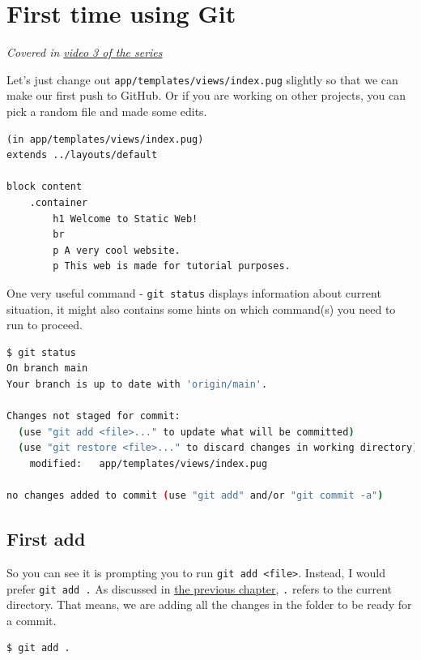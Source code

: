 \section{First time using Git}
\label{sec:gitfirst}

\textit{Covered in \href{https://www.youtube.com/watch?v=wQmFz-Ggxuo&list=PLjGmdnqrOKuYXiu7lgG5HW71jPEUd1XCm&index=4}{video 3 of the series}}
\vspace{6mm}

Let's just change out \texttt{app/templates/views/index.pug} slightly so that we can make our first push to GitHub. Or if you are working on other projects, you can pick a random file and made some edits.

\begin{lstlisting}[language=html]
(in app/templates/views/index.pug)
extends ../layouts/default

block content
	.container
		h1 Welcome to Static Web!
		br
		p A very cool website.
		p This web is made for tutorial purposes.
\end{lstlisting}

One very useful command - \texttt{git status} displays information about current situation, it might also contains some hints on which command(s) you need to run to proceed.

\begin{lstlisting}[language=bash]
$ git status
On branch main
Your branch is up to date with 'origin/main'.

Changes not staged for commit:
  (use "git add <file>..." to update what will be committed)
  (use "git restore <file>..." to discard changes in working directory)
	modified:   app/templates/views/index.pug

no changes added to commit (use "git add" and/or "git commit -a")
\end{lstlisting}

\subsection*{First add}
So you can see it is prompting you to run \texttt{git add <file>}. Instead, I would prefer \texttt{git add .} As discussed in \hyperref[sec:dir]{the previous chapter}, \texttt{.} refers to the current directory. That means, we are adding all the changes in the folder to be ready for a commit.

\begin{lstlisting}[language=bash]
$ git add .
\end{lstlisting}

